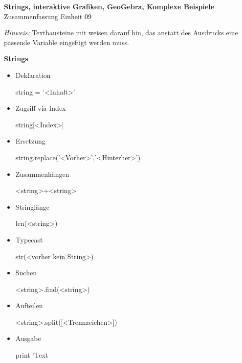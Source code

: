 \documentclass[a4paper,9pt,DIV15,twocolumn]{scrartcl}
\begin{document}
\begin{center}
    \textbf{\LARGE Strings, interaktive Grafiken, GeoGebra, Komplexe Beispiele}\\
    {\large Zusammenfassung Einheit 09}
\end{center}
\textsl{Hinweis:} Textbausteine mit  weisen darauf hin, das anstatt des Ausdrucks eine passende Variable eingefügt werden muss.

\medskip

\textbf{Strings}

\begin{itemize}
 \item Deklaration
\begin{sagein}
string = '<Inhalt>'
\end{sagein}
\item Zugriff via Index
\begin{sagein}
string[<Index>]
\end{sagein}
\item Ersetzung
\begin{sagein}
string.replace('<Vorher>','<Hinterher>')
\end{sagein}
\item Zusammenhängen
\begin{sagein}
 <string>+<string>
\end{sagein}
\item Stringlänge
\begin{sagein}
 len(<string>)
\end{sagein}
\item Typecast
\begin{sagein}
str(<vorher kein String>)
\end{sagein}
\item Suchen
\begin{sagein}
 <string>.find(<string>)
\end{sagein}
\item Aufteilen
\begin{sagein}
 <string>.split([<Trennzeichen>])
\end{sagein}
\item Ausgabe
\begin{sagein}
  print 'Text %
 \end{sagein}
\end{itemize}
\end{document}
